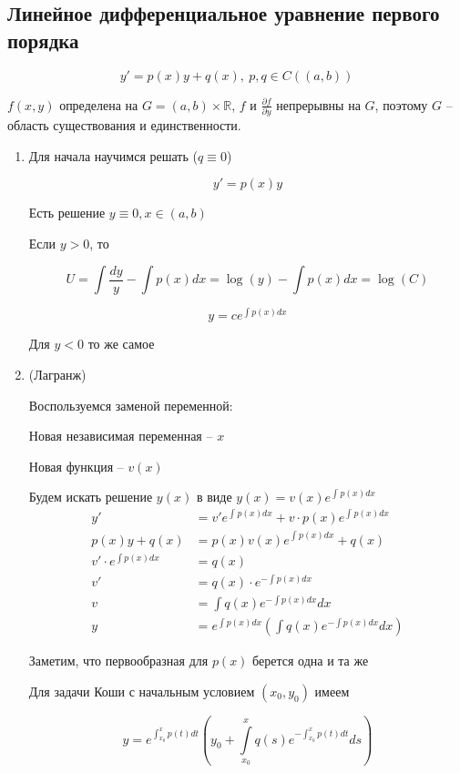 \documentclass[a4paper]{article}
\theoremstyle{indented}
\theoremstyle{definition}
\theoremstyle{remark}
\begin{document}
\subsection{Линейное дифференциальное уравнение первого порядка}

\[y' = p(x) y + q(x), \ p,q \in C((a,b))\]

$f(x,y)$ определена на $G = (a,b) \times \mathbb{R} $, $f$ и $\frac{\partial f}{\partial y}$ непрерывны на $G$, поэтому $G$ -- область существования и единственности.


\begin{enumerate}
\item Для начала научимся решать  ($q \equiv 0$)

  \[y' = p(x) y\]

  Есть решение $y \equiv 0, x \in (a,b)$


  Если $y > 0$, то

  \[U = \int \frac{dy}{y} - \int p(x) dx = \log (y) - \int p(x) dx = \log(C)
  \]

  \[y = c e^{\int p(x) dx}\]

  Для $y < 0$ то же самое


\item {} (Лагранж)

  Воспользуемся заменой переменной:

  Новая независимая переменная -- $x$

  Новая функция -- $v(x)$

  Будем искать решение $y(x)$ в виде $y(x) = v(x) e^{\int_{}^{}p(x) dx}$
  \begin{equation*}
    \begin{aligned}
      y'  & = v' e^{\int_{}^{}p(x) dx} + v \cdot p(x) e^{\int_{}^{}p(x) dx} \\
      p(x)y + q(x) & =  p(x) v(x) e^{\int_{}^{}p(x) dx} + q(x) \\
      v' \cdot e^{\int p(x) dx} & = q(x) \\
      v'& = q(x) \cdot e^{-\int p(x) dx} \\
      v  &= \int q(x) e^{-\int p(x) dx} dx \\
      y & = e^{\int p(x) dx} \left( \int q(x) e^{-\int p(x) dx} dx \right)
  \end{aligned}
\end{equation*}

Заметим, что первообразная для $p(x)$ берется одна и та же

Для задачи Коши с начальным условием $(x_0,y_0)$ имеем


\[y  = e^{\int_{x_0}^x p(t) dt} \left( y_0 + \int\limits_{x_0}^x q(s) e^{-\int_{x_0}^x p(t) dt} ds \right)\]

\end{enumerate}
\end{document}
